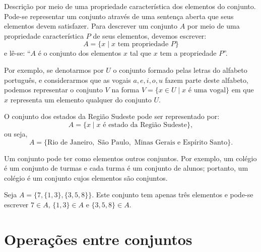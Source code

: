 Descrição por meio de uma propriedade característica dos elementos do conjunto. Pode-se representar um conjunto através de uma sentença aberta que seus elementos devem satisfazer. Para descrever um conjunto $A$ por meio de uma propriedade característica $P$ de seus elementos, devemos escrever: 
\begin{equation*}
A=\{x \mid x \mbox{ tem propriedade } P\}    
\end{equation*}
e lê-se: ``$A$ é o conjunto dos elementos $x$ tal que $x$ tem a propriedade $P$''.

Por exemplo, se denotarmos por $U$ o conjunto formado pelas letras do alfabeto português, e considerarmos que as vogais $a, e, i, o, u$ fazem parte deste alfabeto, podemos representar o conjunto $V$ na forma $V= \{x \in U \mid x \text{ é uma vogal}\}$ em que $x$ representa um elemento qualquer do conjunto $U$.



\begin{exem}
O conjunto dos estados da Região Sudeste pode ser representado por:
\begin{equation*}
    A=\{x\mid x \mbox{ é estado da Região Sudeste}\},
\end{equation*}
ou seja,
\begin{equation*}
A=\{\mbox{Rio de Janeiro}, \mbox{ São Paulo}, \mbox{ Minas
Gerais e Espírito Santo}\}.
\end{equation*}
\end{exem}

Um conjunto pode ter como elementos outros conjuntos. Por exemplo, um 
colégio é um conjunto de turmas e cada turma é um conjunto de alunos; portanto, um 
colégio é um conjunto cujos elementos são conjuntos. 
\begin{exem}
Seja $A=\{7,\{1,3\},\{3,5,8\}\}$. Este conjunto tem apenas três elementos e pode-se escrever $7 \in A$, $\{1,3\} \in A$ e $\{3,5,8\} \in A$.
\end{exem}

\section{Operações entre conjuntos}

